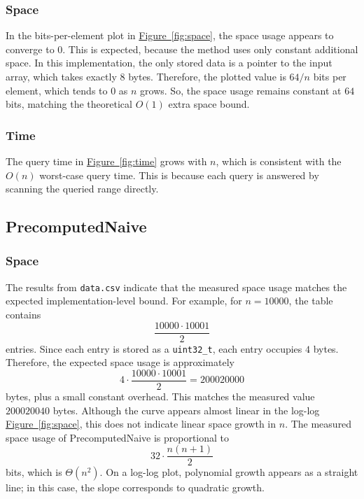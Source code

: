 \documentclass[a4paper,UKenglish,cleveref,thm-restate]{lipics-v2021}
\begin{document}
\subsubsection{Space}
In the bits-per-element plot in \hyperref[fig:space]{Figure~\ref*{fig:space}}, the space usage appears to converge to $0$.
This is expected, because the method uses only constant additional space.
In this implementation, the only stored data is a pointer to the input array, which takes exactly $8$ bytes.
Therefore, the plotted value is $64/n$ bits per element, which tends to $0$ as $n$ grows.
So, the space usage remains constant at $64$ bits, matching the theoretical $O(1)$ extra space bound.
\subsubsection{Time}
The query time in \hyperref[fig:time]{Figure~\ref*{fig:time}} grows with $n$, which is consistent with the $O(n)$ worst-case query time.
This is because each query is answered by scanning the queried range directly.


\subsection{PrecomputedNaive}
\subsubsection{Space}
The results from \texttt{data.csv} indicate that the measured space usage matches
the expected implementation-level bound. For example, for $n = 10000$, the table
contains
\[ \frac{10000 \cdot 10001}{2} \]
entries. Since each entry is stored as a \texttt{uint32\_t}, each entry occupies
$4$ bytes. Therefore, the expected space usage is approximately
\[
	4 \cdot \frac{10000 \cdot 10001}{2}
	=
	200020000
\]
bytes, plus a small constant overhead. This matches the measured value
$200020040$ bytes.
Although the curve appears almost linear in the log-log \hyperref[fig:space]{Figure~\ref*{fig:space}}, this does not indicate linear space growth in $n$.
The measured space usage of PrecomputedNaive is proportional to
\[
	32 \cdot \frac{n(n+1)}{2}
\]
bits, which is $\Theta(n^2)$. On a log-log plot, polynomial growth appears as a
straight line; in this case, the slope corresponds to quadratic growth.
\end{document}
